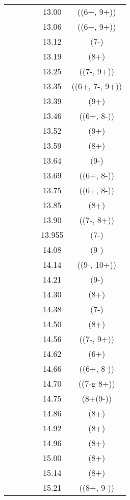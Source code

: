 \begin{center}
\begin{longtable}{cc cc cc}
  &   &   &   & 13.00 & ((6+, 9+))    \\
  &   &   &   & 13.06 & ((6+, 9+))    \\
  &   &   &   & 13.12 & (7-)          \\
  &   &   &   & 13.19 & (8+)  \\
  &   &   &   & 13.25 & ((7-, 9+))  \\
  &   &   &   & 13.35 & ((6+, 7-, 9+))  \\
  &   &   &   & 13.39 & (9+)  \\
  &   &   &   & 13.46 & ((6+, 8-))  \\
  &   &   &   & 13.52 & (9+)  \\
  &   &   &   & 13.59 & (8+)  \\
  &   &   &   & 13.64 & (9-)  \\
  &   &   &   & 13.69 & ((6+, 8-))  \\
  &   &   &   & 13.75 & ((6+, 8-))  \\
  &   &   &   & 13.85 & (8+)  \\
  &   &   &   & 13.90 & ((7-, 8+))  \\
  &   &   &   & 13.955  & (7-)  \\
  &   &   &   & 14.08 &   (9-)          \\
  &   &   &   & 14.14 &   ((9-, 10+))   \\
  &   &   &   & 14.21 &   (9-)  \\
  &   &   &   & 14.30 &   (8+)          \\
  &   &   &   & 14.38 &   (7-)          \\
  &   &   &   & 14.50 &   (8+)          \\
  &   &   &   & 14.56 &   ((7-, 9+))    \\
  &   &   &   & 14.62 &   (6+)          \\
  &   &   &   & 14.66 &   ((6+, 8-))    \\
  &   &   &   & 14.70 &   ((7-g 8+))    \\
  &   &   &   & 14.75 &   (8+(9-))      \\
  &   &   &   & 14.86 &   (8+)          \\
  &   &   &   & 14.92 &   (8+)          \\
  &   &   &   & 14.96 &   (8+)          \\
  &   &   &   & 15.00 &   (8+)          \\
  &   &   &   & 15.14 &   (8+)          \\
  &   &   &   & 15.21 &   ((8+, 9-))    \\

\end{longtable}
\end{center}
